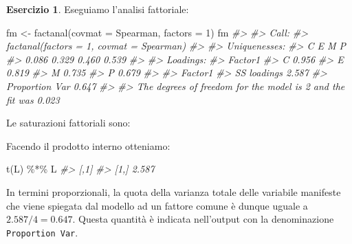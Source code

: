 \documentclass[
  11pt,
]{krantz}
\makeatletter
\newenvironment{Shaded}{\begin{snugshade}}{\end{snugshade}}
\newcommand{\AttributeTok}[1]{\textcolor[rgb]{0.61,0.61,0.61}{#1}}
\newcommand{\CommentTok}[1]{\textcolor[rgb]{0.37,0.37,0.37}{\textit{#1}}}
\newcommand{\DecValTok}[1]{\textcolor[rgb]{0.06,0.06,0.06}{#1}}
\newcommand{\FunctionTok}[1]{\textcolor[rgb]{0,0,0}{#1}}
\newcommand{\NormalTok}[1]{#1}
\newcommand{\OtherTok}[1]{\textcolor[rgb]{0.37,0.37,0.37}{#1}}
\newcommand{\SpecialCharTok}[1]{\textcolor[rgb]{0,0,0}{#1}}
\newenvironment{kframe}{%
\medskip{}
\setlength{\fboxsep}{.8em}
 \def\at@end@of@kframe{}%
 \ifinner\ifhmode%
  \def\at@end@of@kframe{\end{minipage}}%
  \begin{minipage}{\columnwidth}%
 \fi\fi%
 \def\FrameCommand##1{\hskip\@totalleftmargin \hskip-\fboxsep
 \colorbox{shadecolor}{##1}\hskip-\fboxsep
     \hskip-\linewidth \hskip-\@totalleftmargin \hskip\columnwidth}%
 \MakeFramed {\advance\hsize-\width
   \@totalleftmargin\z@ \linewidth\hsize
   \@setminipage}}%
 {\par\unskip\endMakeFramed%
 \at@end@of@kframe}
\renewenvironment{Shaded}{\begin{kframe}}{\end{kframe}}
\theoremstyle{definition}
\theoremstyle{definition}
\theoremstyle{definition}
\newtheorem{exercise}{Esercizio}[chapter]
\theoremstyle{definition}
\theoremstyle{remark}
\makeatother
\begin{document}
\begin{exercise}
Eseguiamo l'analisi fattoriale:

\begin{Shaded}
\begin{Highlighting}[]
\NormalTok{fm }\OtherTok{\textless{}{-}} \FunctionTok{factanal}\NormalTok{(}\AttributeTok{covmat =}\NormalTok{ Spearman, }\AttributeTok{factors =} \DecValTok{1}\NormalTok{)}
\NormalTok{fm}
\CommentTok{\#\textgreater{} }
\CommentTok{\#\textgreater{} Call:}
\CommentTok{\#\textgreater{} factanal(factors = 1, covmat = Spearman)}
\CommentTok{\#\textgreater{} }
\CommentTok{\#\textgreater{} Uniquenesses:}
\CommentTok{\#\textgreater{}     C     E     M     P }
\CommentTok{\#\textgreater{} 0.086 0.329 0.460 0.539 }
\CommentTok{\#\textgreater{} }
\CommentTok{\#\textgreater{} Loadings:}
\CommentTok{\#\textgreater{}   Factor1}
\CommentTok{\#\textgreater{} C 0.956  }
\CommentTok{\#\textgreater{} E 0.819  }
\CommentTok{\#\textgreater{} M 0.735  }
\CommentTok{\#\textgreater{} P 0.679  }
\CommentTok{\#\textgreater{} }
\CommentTok{\#\textgreater{}                Factor1}
\CommentTok{\#\textgreater{} SS loadings      2.587}
\CommentTok{\#\textgreater{} Proportion Var   0.647}
\CommentTok{\#\textgreater{} }
\CommentTok{\#\textgreater{} The degrees of freedom for the model is 2 and the fit was 0.023}
\end{Highlighting}
\end{Shaded}

Le saturazioni fattoriali sono:

\begin{Shaded}
\end{Shaded}

Facendo il prodotto interno otteniamo:

\begin{Shaded}
\begin{Highlighting}[]
\FunctionTok{t}\NormalTok{(L) }\SpecialCharTok{\%*\%}\NormalTok{ L}
\CommentTok{\#\textgreater{}       [,1]}
\CommentTok{\#\textgreater{} [1,] 2.587}
\end{Highlighting}
\end{Shaded}

In termini proporzionali, la quota della varianza totale delle variabile manifeste che viene spiegata dal modello ad un fattore comune è dunque uguale a \(2.587 / 4 = 0.647\). Questa quantità è indicata nell'output con la denominazione \texttt{Proportion\ Var}.
\end{exercise}
\end{document}
